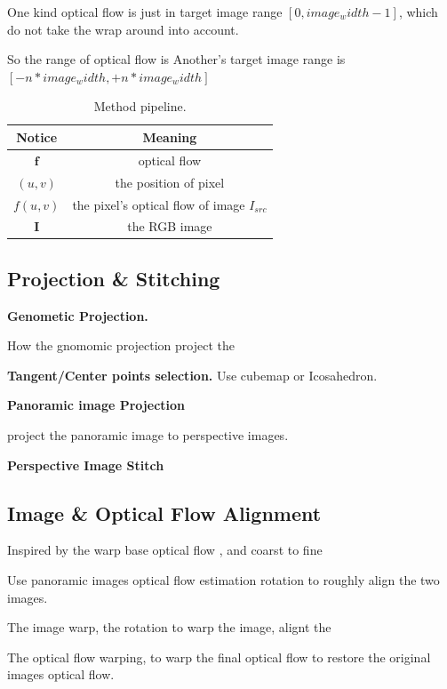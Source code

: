 One kind optical flow is just in target image range $[0, image_width - 1]$, which do not take the wrap around into account.

So the range of optical flow is 
Another's target image range is $[- n * image_width, + n * image_width]$


\begin{table}
	\begin{center}
		\begin{tabular}{ c | c } 
			\hline
			Notice & Meaning  \\ [0.5ex] 
			\hline\hline
			$\textbf{f}$ & optical flow  \\ 
			\hline
			$(u,v)$ & the position of pixel   \\
			\hline
			$f(u,v)$ & the pixel's optical flow of image $I_{src}$ \\
			\hline
			$\textbf{I}$ & the RGB image  \\ [1ex] 
			\hline
		\end{tabular}
	\end{center}
	\caption{Method pipeline. }
	\label{tab:approach:notation}
\end{table}

\subsection{Projection \& Stitching}

\textbf{Genometic Projection.}

How the gnomomic projection project the 

\textbf{Tangent/Center points selection.}
Use cubemap or Icosahedron.

\textbf{Panoramic image Projection}

project the panoramic image to perspective images.


\textbf{Perspective Image Stitch}



\subsection{Image \& Optical Flow Alignment}

Inspired by the warp base optical flow \cite{?}, and coarst to fine 

Use panoramic images optical flow estimation rotation to roughly align the two images.


The image warp, the rotation to warp the image, alignt the 

The optical flow warping, to warp the final optical flow to restore the original images optical flow.
